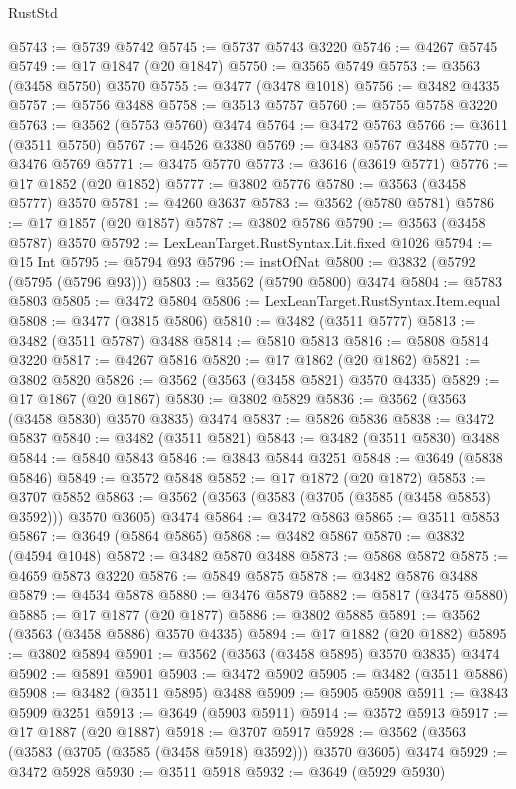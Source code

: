 \begin{lexlean}{RustStd}
\begin{coremodule}
@5743 := @5739 @5742
@5745 := @5737 @5743 @3220
@5746 := @4267 @5745
@5749 := @17 @1847 (@20 @1847)
@5750 := @3565 @5749
@5753 := @3563 (@3458 @5750) @3570
@5755 := @3477 (@3478 @1018)
@5756 := @3482 @4335
@5757 := @5756 @3488
@5758 := @3513 @5757
@5760 := @5755 @5758 @3220
@5763 := @3562 (@5753 @5760) @3474
@5764 := @3472 @5763
@5766 := @3611 (@3511 @5750)
@5767 := @4526 @3380
@5769 := @3483 @5767 @3488
@5770 := @3476 @5769
@5771 := @3475 @5770
@5773 := @3616 (@3619 @5771)
@5776 := @17 @1852 (@20 @1852)
@5777 := @3802 @5776
@5780 := @3563 (@3458 @5777) @3570
@5781 := @4260 @3637
@5783 := @3562 (@5780 @5781)
@5786 := @17 @1857 (@20 @1857)
@5787 := @3802 @5786
@5790 := @3563 (@3458 @5787) @3570
@5792 := LexLeanTarget.RustSyntax.Lit.fixed @1026
@5794 := @15 Int
@5795 := @5794 @93
@5796 := instOfNat
@5800 := @3832 (@5792 (@5795 (@5796 @93)))
@5803 := @3562 (@5790 @5800) @3474
@5804 := @5783 @5803
@5805 := @3472 @5804
@5806 := LexLeanTarget.RustSyntax.Item.equal
@5808 := @3477 (@3815 @5806)
@5810 := @3482 (@3511 @5777)
@5813 := @3482 (@3511 @5787) @3488
@5814 := @5810 @5813
@5816 := @5808 @5814 @3220
@5817 := @4267 @5816
@5820 := @17 @1862 (@20 @1862)
@5821 := @3802 @5820
@5826 := @3562 (@3563 (@3458 @5821) @3570 @4335)
@5829 := @17 @1867 (@20 @1867)
@5830 := @3802 @5829
@5836 := @3562 (@3563 (@3458 @5830) @3570 @3835) @3474
@5837 := @5826 @5836
@5838 := @3472 @5837
@5840 := @3482 (@3511 @5821)
@5843 := @3482 (@3511 @5830) @3488
@5844 := @5840 @5843
@5846 := @3843 @5844 @3251
@5848 := @3649 (@5838 @5846)
@5849 := @3572 @5848
@5852 := @17 @1872 (@20 @1872)
@5853 := @3707 @5852
@5863 := @3562 (@3563 (@3583 (@3705 (@3585 (@3458 @5853) @3592))) @3570 @3605) @3474
@5864 := @3472 @5863
@5865 := @3511 @5853
@5867 := @3649 (@5864 @5865)
@5868 := @3482 @5867
@5870 := @3832 (@4594 @1048)
@5872 := @3482 @5870 @3488
@5873 := @5868 @5872
@5875 := @4659 @5873 @3220
@5876 := @5849 @5875
@5878 := @3482 @5876 @3488
@5879 := @4534 @5878
@5880 := @3476 @5879
@5882 := @5817 (@3475 @5880)
@5885 := @17 @1877 (@20 @1877)
@5886 := @3802 @5885
@5891 := @3562 (@3563 (@3458 @5886) @3570 @4335)
@5894 := @17 @1882 (@20 @1882)
@5895 := @3802 @5894
@5901 := @3562 (@3563 (@3458 @5895) @3570 @3835) @3474
@5902 := @5891 @5901
@5903 := @3472 @5902
@5905 := @3482 (@3511 @5886)
@5908 := @3482 (@3511 @5895) @3488
@5909 := @5905 @5908
@5911 := @3843 @5909 @3251
@5913 := @3649 (@5903 @5911)
@5914 := @3572 @5913
@5917 := @17 @1887 (@20 @1887)
@5918 := @3707 @5917
@5928 := @3562 (@3563 (@3583 (@3705 (@3585 (@3458 @5918) @3592))) @3570 @3605) @3474
@5929 := @3472 @5928
@5930 := @3511 @5918
@5932 := @3649 (@5929 @5930)

\end{coremodule}
\end{lexlean}
